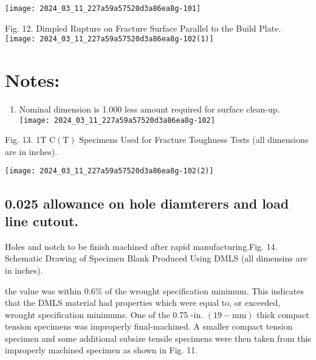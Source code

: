 \documentclass[10pt]{article}
\begin{document}
\begin{center}
\texttt{[image: 2024\_03\_11\_227a59a57520d3a86ea8g-101]}
\end{center}

Fig. 12. Dimpled Rupture on Fracture Surface Parallel to the Build Plate.\\
\texttt{[image: 2024\_03\_11\_227a59a57520d3a86ea8g-102(1)]}

\section*{Notes:}
\begin{enumerate}
  \item Nominal dimension is 1.000 less amount required for surface clean-up.\\
\texttt{[image: 2024\_03\_11\_227a59a57520d3a86ea8g-102]}
\end{enumerate}

Fig. 13. 1T $\mathrm{C}(\mathrm{T})$ Specimens Used for Fracture Toughness Tests (all dimensions are in inches).

\begin{center}
\texttt{[image: 2024\_03\_11\_227a59a57520d3a86ea8g-102(2)]}
\end{center}

\subsection*{0.025 allowance on hole diamterers and load line cutout.}
 Holes and notch to be finish machined after rapid manufacturing.Fig. 14. Schematic Drawing of Specimen Blank Produced Using DMLS (all dimensins are in inches).

the value was within $0.6 \%$ of the wrought specification minimum. This indicates that the DMLS material had properties which were equal to, or exceeded, wrought specification minimums. One of the 0.75 -in. $(19-\mathrm{mm})$ thick compact tension specimens was improperly final-machined. A smaller compact tension specimen and some additional subsize tensile specimens were then taken from this improperly machined specimen as shown in Fig. 11.
\end{document}
